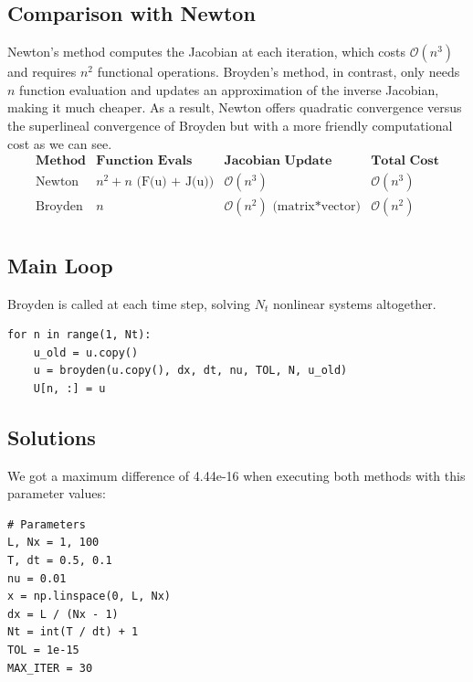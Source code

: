 \documentclass[12pt]{article}
\begin{document}
\subsection{Comparison with Newton}
Newton’s method computes the  Jacobian at each iteration, which costs \( \mathcal{O}(n^3) \) and requires \( n^2 \) functional operations.  Broyden’s method, in contrast, only needs $n$ function evaluation and updates an approximation of the inverse Jacobian, making it much cheaper. As a result, Newton offers quadratic convergence versus the superlineal convergence of Broyden but with a more friendly computational cost as we can see.
\[
\begin{array}{l|c|c|c}
\textbf{Method} & \textbf{Function Evals}  & \textbf{Jacobian Update} & \textbf{Total Cost} \\
\hline
\text{Newton} &  n^2 + n \text{ (F(u) + J(u))} & \mathcal{O}(n^3)  & \mathcal{O}(n^3) \\
\text{Broyden} & n & \mathcal{O}(n^2) \text{ (matrix*vector)} & \mathcal{O}(n^2) \\
\end{array}
\]


\subsection{Main Loop}
Broyden is called at each time step, solving $N_t$ nonlinear systems altogether.
\begin{verbatim}
for n in range(1, Nt):
    u_old = u.copy()
    u = broyden(u.copy(), dx, dt, nu, TOL, N, u_old)
    U[n, :] = u
\end{verbatim}
\subsection{Solutions}
We got a maximum difference of 4.44e-16 when executing both methods with this parameter values: 

\begin{verbatim}
# Parameters
L, Nx = 1, 100
T, dt = 0.5, 0.1
nu = 0.01
x = np.linspace(0, L, Nx)
dx = L / (Nx - 1)
Nt = int(T / dt) + 1  
TOL = 1e-15
MAX_ITER = 30
\end{verbatim}
\end{document}

